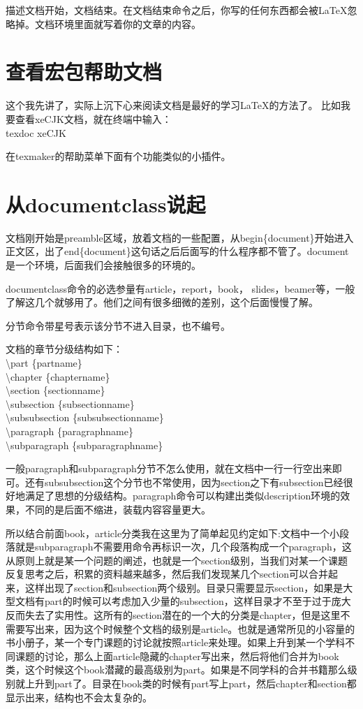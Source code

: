\documentclass[11pt,oneside]{book}
\begin{document}
描述文档开始，文档结束。在文档结束命令之后，你写的任何东西都会被\LaTeX 忽略掉。文档环境里面就写着你的文章的内容。

\section{查看宏包帮助文档}
这个我先讲了，实际上沉下心来阅读文档是最好的学习\LaTeX 的方法了。
比如我要查看xeCJK文档，就在终端中输入：\\
texdoc xeCJK

在texmaker的帮助菜单下面有个功能类似的小插件。

\section{从documentclass说起}
\label{sec:documentclass}
文档刚开始是preamble区域，放着文档的一些配置，从begin\{document\}开始进入正文区，出了end\{document\}这句话之后后面写的什么程序都不管了。document是一个环境，后面我们会接触很多的环境的。

documentclass命令的必选参量有article，report，book， slides，beamer等，一般了解这几个就够用了。他们之间有很多细微的差别，这个后面慢慢了解。

分节命令带星号表示该分节不进入目录，也不编号。

文档的章节分级结构如下：\\
\textbackslash part \{partname\}\\
\textbackslash chapter \{chaptername\}\\
\textbackslash section \{sectionname\}\\
\textbackslash subsection \{subsectionname\}\\
\textbackslash subsubsection \{subsubsectionname\}\\
\textbackslash paragraph \{paragraphname\}\\
\textbackslash subparagraph \{subparagraphname\}

一般paragraph和subparagraph分节不怎么使用，就在文档中一行一行空出来即可。还有subsubsection这个分节也不常使用，因为section之下有subsection已经很好地满足了思想的分级结构。paragraph命令可以构建出类似description环境的效果，不同的是后面不缩进，装载内容容量更大。

所以结合前面book，article分类我在这里为了简单起见约定如下:文档中一个小段落就是subparagraph不需要用命令再标识一次，几个段落构成一个paragraph，这从原则上就是某一个问题的阐述，也就是一个section级别，当我们对某一个课题反复思考之后，积累的资料越来越多，然后我们发现某几个section可以合并起来，这样出现了section和subsection两个级别。目录只需要显示section，如果是大型文档有part的时候可以考虑加入少量的subsection，这样目录才不至于过于庞大反而失去了实用性。这所有的section潜在的一个大的分类是chapter，但是这里不需要写出来，因为这个时候整个文档的级别是article。也就是通常所见的小容量的书小册子，某一个专门课题的讨论就按照article来处理。如果上升到某一个学科不同课题的讨论，那么上面article隐藏的chapter写出来，然后将他们合并为book类，这个时候这个book潜藏的最高级别为part。如果是不同学科的合并书籍那么级别就上升到part了。目录在book类的时候有part写上part，然后chapter和section都显示出来，结构也不会太复杂的。
\end{document}
